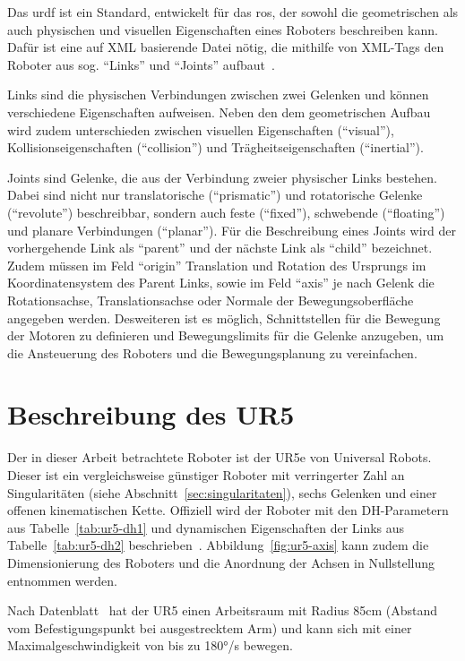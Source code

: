 Das \ac{urdf} ist ein Standard, entwickelt für das \acf{ros}, der sowohl die geometrischen als auch physischen und visuellen Eigenschaften eines Roboters beschreiben kann.
Dafür ist eine auf XML basierende Datei nötig, die mithilfe von XML-Tags den Roboter aus sog. \enquote{Links} und \enquote{Joints} aufbaut~\cite{ros.orgUrdfXMLModel}.

Links sind die physischen Verbindungen zwischen zwei Gelenken und können verschiedene Eigenschaften aufweisen.
Neben den dem geometrischen Aufbau wird zudem unterschieden zwischen visuellen Eigenschaften (\enquote{visual}), Kollisionseigenschaften (\enquote{collision}) und Trägheitseigenschaften (\enquote{inertial}).

Joints sind Gelenke, die aus der Verbindung zweier physischer Links bestehen.
Dabei sind nicht nur translatorische (\enquote{prismatic}) und rotatorische Gelenke (\enquote{revolute}) beschreibbar, sondern auch feste (\enquote{fixed}), schwebende (\enquote{floating}) und planare Verbindungen (\enquote{planar}).
Für die Beschreibung eines Joints wird der vorhergehende Link als \enquote{parent} und der nächste Link als \enquote{child} bezeichnet.
Zudem müssen im Feld \enquote{origin} Translation und Rotation des Ursprungs im Koordinatensystem des Parent Links, sowie im Feld \enquote{axis} je nach Gelenk die Rotationsachse, Translationsachse oder Normale der Bewegungsoberfläche angegeben werden.
Desweiteren ist es möglich, Schnittstellen für die Bewegung der Motoren zu definieren und Bewegungslimits für die Gelenke anzugeben, um die Ansteuerung des Roboters und die Bewegungsplanung zu vereinfachen.

\section{Beschreibung des UR5}\label{sec:ur5-in-dh}
Der in dieser Arbeit betrachtete Roboter ist der UR5e von Universal Robots.
Dieser ist ein vergleichsweise günstiger Roboter mit verringerter Zahl an Singularitäten (siehe Abschnitt~\ref{sec:singularitaten}), sechs Gelenken und einer offenen kinematischen Kette.
Offiziell wird der Roboter mit den DH-Parametern aus Tabelle~\ref{tab:ur5-dh1} und dynamischen Eigenschaften der Links aus Tabelle~\ref{tab:ur5-dh2} beschrieben~\cite{universalrobotsUniversalRobotsDH}.
Abbildung~\ref{fig:ur5-axis} kann zudem die Dimensionierung des Roboters und die Anordnung der Achsen in Nullstellung entnommen werden.

Nach Datenblatt~\cite{universalrobotsUR5TechnicalSpecifications} hat der UR5 einen Arbeitsraum mit Radius 85cm (Abstand vom Befestigungspunkt bei ausgestrecktem Arm) und kann sich mit einer Maximalgeschwindigkeit von bis zu 180°/s bewegen.

